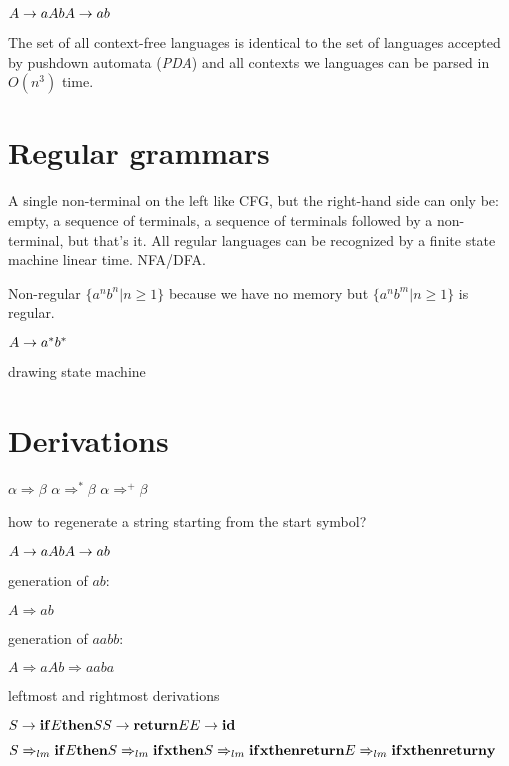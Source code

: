 \documentclass[11pt,twocolumn,nocopyright]{sigplanconf}
\begin{document}
\noindent $
A \rightarrow a A b\\
A \rightarrow a b\\
$

The set of all context-free languages is identical to the set of languages accepted by pushdown automata ({\em PDA}) and all contexts we languages can be parsed in $O(n^3)$ time.

\section{Regular grammars}

A single non-terminal on the left like CFG, but the right-hand side can only be: empty, a sequence of terminals, a sequence of terminals followed by a non-terminal, but that's it. All regular languages can be recognized by a finite state machine linear time. NFA/DFA.

Non-regular $\{a^nb^n | n \ge 1\}$ because we have no memory but $\{a^nb^m | n \ge 1\}$ is regular.

\noindent $
A \rightarrow a^* b^*\\
$

  drawing state machine
 
\section{Derivations}

$\alpha \Rightarrow \beta$ $\alpha \Rightarrow^* \beta$ $\alpha \Rightarrow^+ \beta$

how to regenerate a string starting from the start symbol?

\noindent $
A \rightarrow a A b\\
A \rightarrow a b\\
$

generation of $ab$:
 
$A \Rightarrow ab$

generation of $aabb$:
 
$A \Rightarrow aAb \Rightarrow aaba$

leftmost and rightmost derivations
 
\noindent $
S \rightarrow {\bf if} E {\bf then} S\\
S \rightarrow {\bf return} E\\
E \rightarrow {\bf id}\\
$

$S \Rightarrow_{lm} {\bf if} E {\bf then} S \\
\Rightarrow_{lm} {\bf if} {\bf x} {\bf then} S \\
\Rightarrow_{lm} {\bf if} {\bf x} {\bf then} {\bf return} E \\
\Rightarrow_{lm} {\bf if} {\bf x} {\bf then} {\bf return} {\bf y}$
\end{document}
